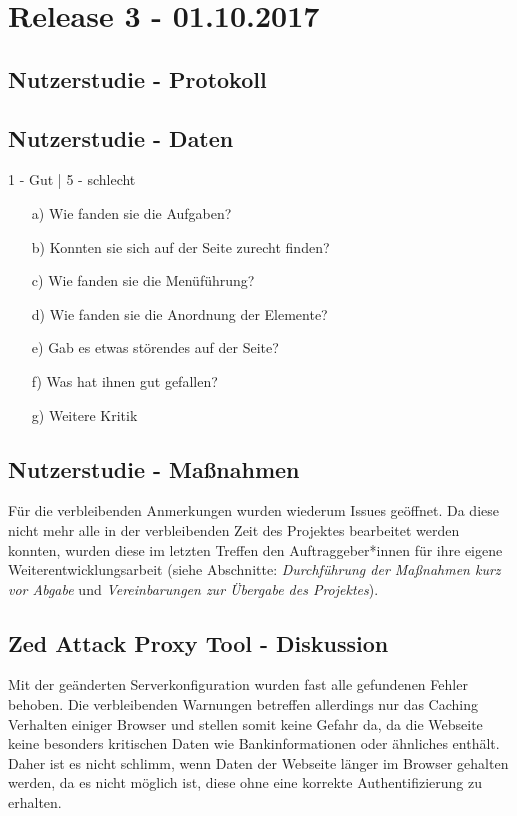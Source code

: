 \documentclass[accentcolor=tud0b,12pt,paper=a4]{tudreport}
\begin{document}
\section{Release 3 - 01.10.2017}

	\subsection*{Nutzerstudie - Protokoll}
	
	
	\subsection*{Nutzerstudie - Daten}
	\begin{adjustbox}{max width=\textwidth}
	\end{adjustbox}
	\begin{footnotesize} 1 - Gut | 5 - schlecht \end{footnotesize}
	\begin{itemize}
		\item[a)] Wie fanden sie die Aufgaben?
		\item[b)] Konnten sie sich auf der Seite zurecht finden?
		\item[c)] Wie fanden sie die Menüführung?
		\item[d)] Wie fanden sie die Anordnung der Elemente?
		\item[e)] Gab es etwas störendes auf der Seite?
		\item[f)] Was hat ihnen gut gefallen?
		\item[g)] Weitere Kritik
	\end{itemize}

	\subsection*{Nutzerstudie - Maßnahmen}
	Für die verbleibenden Anmerkungen wurden wiederum Issues geöffnet. Da diese nicht mehr alle in der verbleibenden Zeit des Projektes bearbeitet werden konnten, wurden diese im letzten Treffen den Auftraggeber*innen für ihre eigene Weiterentwicklungsarbeit (siehe Abschnitte: \emph{Durchführung der Maßnahmen kurz vor Abgabe} und \emph{Vereinbarungen zur Übergabe des Projektes}).

	
	\subsection*{Zed Attack Proxy Tool - Diskussion}
	Mit der geänderten Serverkonfiguration wurden fast alle gefundenen Fehler behoben. Die verbleibenden Warnungen betreffen allerdings nur das Caching Verhalten einiger Browser und stellen somit keine Gefahr da, da die Webseite keine besonders kritischen Daten wie Bankinformationen oder ähnliches enthält. Daher ist es nicht schlimm, wenn Daten der Webseite länger im Browser gehalten werden, da es nicht möglich ist, diese ohne eine korrekte Authentifizierung zu erhalten.
\end{document}
